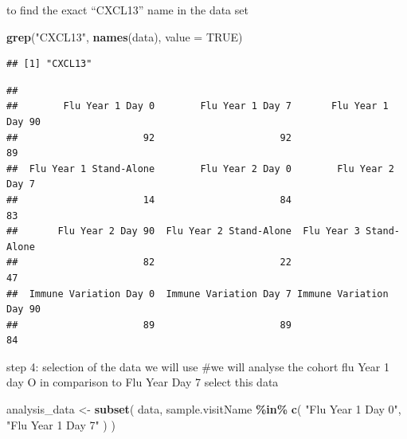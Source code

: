 \documentclass[
]{article}
\newenvironment{Shaded}{\begin{snugshade}}{\end{snugshade}}
\newcommand{\AttributeTok}[1]{\textcolor[rgb]{0.13,0.29,0.53}{#1}}
\newcommand{\ConstantTok}[1]{\textcolor[rgb]{0.56,0.35,0.01}{#1}}
\newcommand{\FunctionTok}[1]{\textcolor[rgb]{0.13,0.29,0.53}{\textbf{#1}}}
\newcommand{\NormalTok}[1]{#1}
\newcommand{\OtherTok}[1]{\textcolor[rgb]{0.56,0.35,0.01}{#1}}
\newcommand{\SpecialCharTok}[1]{\textcolor[rgb]{0.81,0.36,0.00}{\textbf{#1}}}
\newcommand{\StringTok}[1]{\textcolor[rgb]{0.31,0.60,0.02}{#1}}
\begin{document}
to find the exact ``CXCL13'' name in the data set

\begin{Shaded}
\begin{Highlighting}[]
\FunctionTok{grep}\NormalTok{(}\StringTok{"CXCL13"}\NormalTok{, }\FunctionTok{names}\NormalTok{(data), }\AttributeTok{value =} \ConstantTok{TRUE}\NormalTok{)}
\end{Highlighting}
\end{Shaded}

\begin{verbatim}
## [1] "CXCL13"
\end{verbatim}

\begin{Shaded}
\end{Shaded}

\begin{verbatim}
## 
##        Flu Year 1 Day 0        Flu Year 1 Day 7       Flu Year 1 Day 90 
##                      92                      92                      89 
##  Flu Year 1 Stand-Alone        Flu Year 2 Day 0        Flu Year 2 Day 7 
##                      14                      84                      83 
##       Flu Year 2 Day 90  Flu Year 2 Stand-Alone  Flu Year 3 Stand-Alone 
##                      82                      22                      47 
##  Immune Variation Day 0  Immune Variation Day 7 Immune Variation Day 90 
##                      89                      89                      84
\end{verbatim}

step 4: selection of the data we will use \#we will analyse the cohort
flu Year 1 day O in comparison to Flu Year Day 7 select this data

\begin{Shaded}
\begin{Highlighting}[]
\NormalTok{analysis\_data }\OtherTok{\textless{}{-}} \FunctionTok{subset}\NormalTok{(}
\NormalTok{  data,}
\NormalTok{  sample.visitName }\SpecialCharTok{\%in\%} \FunctionTok{c}\NormalTok{(}
    \StringTok{"Flu Year 1 Day 0"}\NormalTok{,}
    \StringTok{"Flu Year 1 Day 7"}
\NormalTok{  )}
\NormalTok{)}
\end{Highlighting}
\end{Shaded}

\begin{Shaded}
\end{Shaded}
\end{document}
